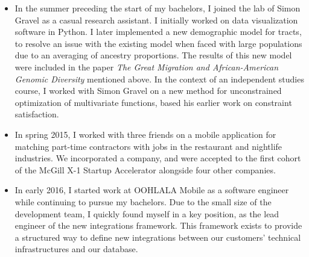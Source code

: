\documentclass[11pt,letterpaper]{article}
\begin{document}
\begin{itemize}
  \item
    In the summer preceding the start of my bachelors, I joined the lab of
    Simon Gravel\footnotemark{} as a casual research assistant.
    I initially worked on data visualization software in Python. I later
    implemented a new demographic model for tracts,\footnotemark{} to resolve
    an issue with the existing model when faced with large populations due to
    an averaging of ancestry proportions.
    The results of this new model were included in the paper \emph{The Great
    Migration and African-American Genomic Diversity} mentioned above.  In the
    context of an independent studies course, I worked with Simon Gravel on a
    new method for unconstrained optimization of multivariate functions, based
    his earlier work\footnotemark{} on constraint satisfaction.

  \item
    In spring 2015, I worked with three friends on a mobile application for
    matching part-time contractors with jobs in the restaurant and nightlife
    industries. We incorporated a company, and were accepted to the first
    cohort of the McGill X-1 Startup Accelerator\footnotemark{} alongside four
    other companies.

  \item
    In early 2016, I started work at OOHLALA Mobile\footnotemark{} as a
    software engineer while continuing to pursue my bachelors. Due to the small
    size of the development team, I quickly found myself in a key position, as
    the lead engineer of the new integrations framework. This framework exists
    to provide a structured way to define new integrations between our
    customers' technical infrastructures and our database.


\end{itemize}
\end{document}

